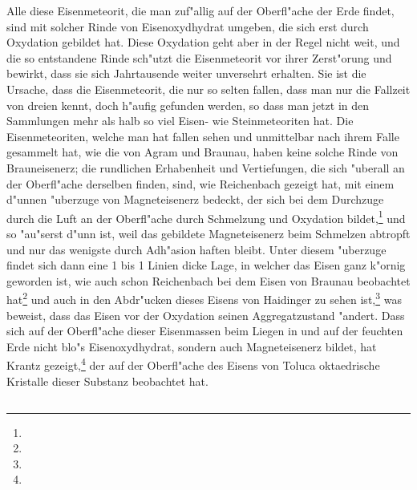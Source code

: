 \documentclass[a4paper, 11pt, oneside]{article}
\begin{document}
Alle diese Eisenmeteorit, die man zuf"allig auf der Oberfl"ache der Erde findet, sind mit solcher Rinde von Eisenoxydhydrat umgeben, die sich erst durch Oxydation gebildet hat. Diese Oxydation geht aber in der Regel nicht weit, und die so entstandene Rinde sch"utzt die Eisenmeteorit vor ihrer Zerst"orung und bewirkt, dass sie sich Jahrtausende weiter unversehrt erhalten. Sie ist die Ursache, dass die Eisenmeteorit, die nur so selten fallen, dass man nur die Fallzeit von dreien kennt, doch h"aufig gefunden werden, so dass man jetzt in den Sammlungen mehr als halb so viel Eisen- wie Steinmeteoriten hat. Die Eisenmeteoriten, welche man hat fallen sehen und unmittelbar nach ihrem Falle gesammelt hat, wie die von Agram und Braunau, haben keine solche Rinde von Brauneisenerz; die rundlichen Erhabenheit und Vertiefungen, die sich "uberall an der Oberfl"ache derselben finden, sind, wie Reichenbach gezeigt hat, mit einem d"unnen "uberzuge von Magneteisenerz bedeckt, der sich bei dem Durchzuge durch die Luft an der Oberfl"ache durch Schmelzung und Oxydation bildet,\footnote{} und so "au"serst d"unn ist, weil das gebildete Magneteisenerz beim Schmelzen abtropft und nur das wenigste durch Adh"asion haften bleibt. Unter diesem "uberzuge findet sich dann eine 1 bis 1 Linien dicke Lage, in welcher das Eisen ganz k"ornig geworden ist, wie auch schon Reichenbach bei dem Eisen von Braunau beobachtet hat\footnote{} und auch in den Abdr"ucken dieses Eisens von Haidinger zu sehen ist,\footnote{} was beweist, dass das Eisen vor der Oxydation seinen Aggregatzustand "andert. Dass sich auf der Oberfl"ache dieser Eisenmassen beim Liegen in und auf der feuchten Erde nicht blo"s Eisenoxydhydrat, sondern auch Magneteisenerz bildet, hat Krantz gezeigt,\footnote{} der auf der Oberfl"ache des Eisens von Toluca oktaedrische Kristalle dieser Substanz beobachtet hat.
\subsection{}
\end{document}
